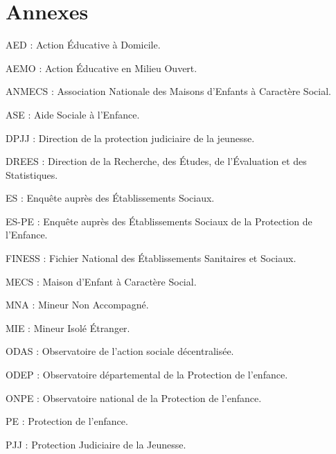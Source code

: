 \documentclass[
  12,
  a4paper,
]{report}
\begin{document}
\newpage
\listoftables

\newpage
\listoffigures

\newpage

{}
\section*{\large Annexes}

\vspace{.5cm}

\begin{mdframed}[frametitle=Liste de sigles]

AED : Action Éducative à Domicile.

AEMO :  Action Éducative en Milieu Ouvert.

ANMECS : Association Nationale des Maisons d’Enfants à Caractère Social.

ASE : Aide Sociale à l’Enfance.

DPJJ : Direction de la protection judiciaire de la jeunesse.

DREES : Direction de la Recherche, des Études, de l’Évaluation et des Statistiques.

ES : Enquête auprès des Établissements Sociaux.

ES-PE : Enquête auprès des Établissements Sociaux de la Protection de l’Enfance.

FINESS : Fichier National des Établissements Sanitaires et Sociaux.

MECS : Maison d’Enfant à Caractère Social.

MNA : Mineur Non Accompagné.

MIE : Mineur Isolé Étranger.

ODAS : Observatoire de l’action sociale décentralisée.

ODEP : Observatoire départemental de la Protection de l’enfance.

ONPE : Observatoire national de la Protection de l’enfance.

PE : Protection de l’enfance.

PJJ : Protection Judiciaire de la Jeunesse.

\end{mdframed}
\end{document}
